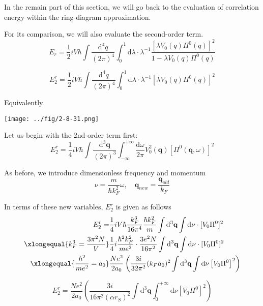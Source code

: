 In the remain part of this section, we will go back to the evaluation of correlation energy within the ring-diagram approximation.

For its comparison, we will also evaluate the second-order term.
\begin{equation*} \tag{2.8.9}
E_r = \frac{1}{2}i V\hbar \int \frac{\mathrm{d}^4 q}{(2\pi)^4} \int_0^1 \mathrm{d} \lambda \cdot \lambda^{-1} \frac{[\lambda V_0(q) \Pi^0(q)]^2}{1-\lambda V_0(q) \Pi^0(q)}
\end{equation*}

\begin{equation*} \label{Eqs2.8.9.a} \tag{2.8.9.a}
E_2^r = \frac{1}{2}i V \hbar\int \frac{\mathrm{d}^4 q}{(2\pi)^4} \int_0^1 \mathrm{d} \lambda \cdot \lambda^{-1}  \left[ \lambda V_0(q)\Pi^0(q) \right]^2
\end{equation*}

Equivalently
\begin{center} \label{Fig2.8.31}
\texttt{[image: ../fig/2-8-31.png]}
\end{center}

Let us begin with the 2nd-order term first:
\[E_2^r = \frac{1}{4}i V \hbar\int \frac{\mathrm{d}^3 \mathbf{q}}{(2\pi)^3} \int_{-\infty}^{+\infty} \frac{\mathrm{d} \omega}{2\pi} V_0^2(\mathbf{q})  \left[ \Pi^0(\mathbf{q},\omega) \right]^2\]

As before, we introduce dimensionless frequency and momentum
\begin{equation*} \tag{2.8.18}
\nu = \frac{m}{\hbar k_F^2} \omega, \quad \mathbf{q}_{new} = \frac{\mathbf{q}_{old}}{k_F}
\end{equation*}

In terms of these new variables, $E_2^r$ is given as follows
\[\begin{split}E_2^r =& \frac{1}{4}i V \hbar \frac{k_F^3}{16\pi^4} \frac{\hbar k_F^2}{m}
\int \mathrm{d}^3 \mathbf{q} \int \mathrm{d} \nu \cdot [V_0 \Pi^0]^2\\
\xlongequal{k_F^3 = \frac{3\pi^2 N}{V}}& \frac{1}{4}i\frac{\hbar^2 k_F^2}{m e^2}\cdot \frac{3 e^2 N}{16 \pi^2}
\int \mathrm{d}^3 \mathbf{q} \int \mathrm{d} \nu \cdot [V_0 \Pi^0]^2\\
\xlongequal{\frac{\hbar^2}{m e^2}=a_0}& \frac{N e^2}{2 a_0} \left( \frac{3i}{32\pi^2}(k_F a_0)^2 \int \mathrm{d}^3 \mathbf{q} \int \mathrm{d} \nu \left[ V_0 \Pi^0 \right]^2 \right)
\end{split}\]

\begin{equation*} \label{Eqs2.8.9.b} \tag{2.8.9.b}
E_2^r = \frac{N e^2}{2 a_0} \left( \frac{3i}{16\pi^2 (\alpha r_S)^2} \int \mathrm{d}^3 \mathbf{q} \int_0^{+\infty} \mathrm{d} \nu \left[ V_0 \Pi^0 \right]^2 \right)
\end{equation*}

